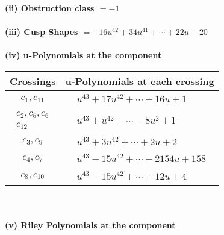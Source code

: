 \documentclass[1p]{elsarticle_modified}
\theoremstyle{definition}
\begin{document}
\flushleft \textbf{(ii) Obstruction class $= -1$}\\~\\
\flushleft \textbf{(iii) Cusp Shapes $= -16 u^{42}+34 u^{41}+\cdots+22 u-20$}\\~\\
\newpage\renewcommand{\arraystretch}{1}
\flushleft \textbf{(iv) u-Polynomials at the component}\newline \\
\begin{tabular}{m{50pt}|m{274pt}}
Crossings & \hspace{64pt}u-Polynomials at each crossing \\
\hline $$\begin{aligned}c_{1},c_{11}\end{aligned}$$&$\begin{aligned}
&u^{43}+17 u^{42}+\cdots+16 u+1
\end{aligned}$\\
\hline $$\begin{aligned}c_{2},c_{5},c_{6}\\c_{12}\end{aligned}$$&$\begin{aligned}
&u^{43}+u^{42}+\cdots-8 u^2+1
\end{aligned}$\\
\hline $$\begin{aligned}c_{3},c_{9}\end{aligned}$$&$\begin{aligned}
&u^{43}+3 u^{42}+\cdots+2 u+2
\end{aligned}$\\
\hline $$\begin{aligned}c_{4},c_{7}\end{aligned}$$&$\begin{aligned}
&u^{43}-15 u^{42}+\cdots-2154 u+158
\end{aligned}$\\
\hline $$\begin{aligned}c_{8},c_{10}\end{aligned}$$&$\begin{aligned}
&u^{43}-15 u^{42}+\cdots+12 u+4
\end{aligned}$\\
\hline
\end{tabular}\\~\\
\newpage\renewcommand{\arraystretch}{1}
\flushleft \textbf{(v) Riley Polynomials at the component}\newline \\
\end{document}
